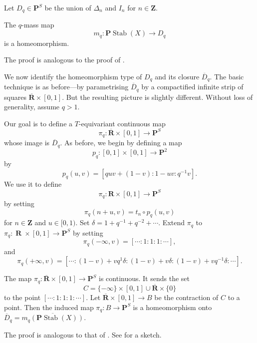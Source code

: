 \documentclass{amsart}
\begin{document}
Let \(D_q \in \mathbf{P}^S\) be the union of \(\Delta_n\) and \(I_n\) for \(n \in \mathbf{Z}\).
\begin{theorem}\label{thm:q-homeo}
  The \(q\)-mass map
  \[ m_q \colon \mathbf{P} \operatorname{Stab}(X) \to D_q\]
  is a homeomorphism.
\end{theorem}
The proof is analogous to the proof of .

We now identify the homeomorphism type of \(D_q\) and its closure \(\overline D_q\).
The basic technique is as before---by parametrising \(\overline D_q\) by a compactified infinite strip of squares \(\overline {\mathbf{R}} \times [0,1]\).
But the resulting picture is slightly different.
Without loss of generality, assume \(q > 1\).

Our goal is to define a \(T\)-equivariant continuous map
\[ \pi_q \colon \overline{\mathbf{R}} \times [0,1] \to \mathbf{P}^S\]
whose image is \(\overline D_q\).
As before, we begin by defining a map
\[ p_{q} \colon [0,1] \times [0,1] \to \mathbf{P}^2\]
by \[p_q (u,v) = [quv + (1-v): 1-uv: q^{-1}v].\]
We use it to define
\[ \pi_q \colon \mathbf{R} \times [0,1] \to \mathbf{P}^S\]
by setting
\[ \pi_q(n+u,v) = t_n \circ p_q(u,v)\]
for \(n \in \mathbf{Z}\) and \(u \in [0,1)\).
Set \(\delta = 1 + q^{-1} + q^{-2} + \cdots\).
Extend \(\pi_q\) to \(\pi_q \colon \operatorname{\mathbf{R}} \times [0,1] \to \mathbf{P}^{S}\) by setting
\[ \pi_q(-\infty, v) = [\cdots : 1 : 1 : 1: \cdots],\]
and
\[ \pi_q(+\infty, v) = [\cdots : (1-v) + v q^{1} \delta : (1-v) + v\delta : (1-v) + v q^{-1}\delta : \cdots].\]
\begin{theorem}\label{prop:q-pi}
  The map \(\pi_{q} \colon \overline{\mathbf{R}} \times [0,1] \to \mathbf{P}^S\) is continuous.
  It sends the set \[C = \{- \infty\} \times [0,1] \cup \overline{\mathbf{R}} \times \{0\}\]
  to the point \([\cdots: 1: 1: 1: \cdots]\).
  Let \(\overline{\mathbf{R}} \times [0,1] \to B\) be the contraction of \(C\) to a point.
  Then the induced map \(\pi_{q} \colon B \to \mathbf{P}^S\) is a homeomorphism onto \(\overline D_q = \overline{m_{q}(\mathbf{P}\operatorname{Stab}(X))}\).
\end{theorem}
The proof is analogous to that of .
See  for a sketch.
\end{document}
